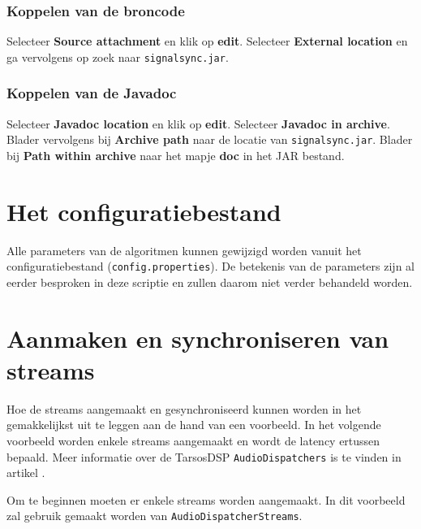 \subsubsection{Koppelen van de broncode}

Selecteer \textbf{Source attachment} en klik op \textbf{edit}. Selecteer \textbf{External location} en ga vervolgens op zoek naar \texttt{signalsync.jar}.

\subsubsection{Koppelen van de Javadoc}

Selecteer \textbf{Javadoc location} en klik op \textbf{edit}. Selecteer \textbf{Javadoc in archive}. Blader vervolgens bij \textbf{Archive path} naar de locatie van \texttt{signalsync.jar}. Blader bij \textbf{Path within archive} naar het mapje \textbf{doc} in het JAR bestand.

\section*{Het configuratiebestand}

Alle parameters van de algoritmen kunnen gewijzigd worden vanuit het configuratiebestand (\texttt{config.properties}). De betekenis van de parameters zijn al eerder besproken in deze scriptie en zullen daarom niet verder behandeld worden.

\section*{Aanmaken en synchroniseren van streams}

Hoe de streams aangemaakt en gesynchroniseerd kunnen worden in het gemakkelijkst uit te leggen aan de hand van een voorbeeld. In het volgende voorbeeld worden enkele streams aangemaakt en wordt de latency ertussen bepaald. Meer informatie over de TarsosDSP \texttt{AudioDispatchers} is te vinden in artikel \cite{six2014tarsosdsp}.

Om te beginnen moeten er enkele streams worden aangemaakt. In dit voorbeeld zal gebruik gemaakt worden van \texttt{AudioDispatcherStreams}. \\

\lstset{basicstyle=\footnotesize,style=javaStyle}

